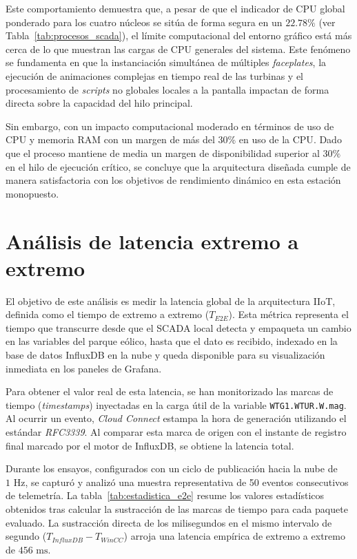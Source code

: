 Este comportamiento demuestra que, a pesar de que el indicador de \ac{CPU} global ponderado para los cuatro núcleos se sitúa de forma segura en un $22.78\%$ (ver Tabla~\ref{tab:procesos_scada}), el límite computacional del entorno gráfico está más cerca de lo que muestran las cargas de \ac{CPU} generales del sistema. Este fenómeno se fundamenta en que la instanciación simultánea de múltiples \textit{faceplates}, la ejecución de animaciones complejas en tiempo real de las turbinas y el procesamiento de \textit{scripts} no globales locales a la pantalla impactan de forma directa sobre la capacidad del hilo principal.

Sin embargo, con un impacto computacional moderado en términos de uso de \ac{CPU} y memoria \ac{RAM} con un margen de  más del $30$\% en uso de la \ac{CPU}. Dado que el proceso mantiene de media un margen de disponibilidad superior al $30\%$ en el hilo de ejecución crítico, se concluye que la arquitectura diseñada cumple de manera satisfactoria con los objetivos de rendimiento dinámico en esta estación monopuesto.
\FloatBarrier
\section{Análisis de latencia extremo a extremo}
El objetivo de este análisis es medir la latencia global de la arquitectura IIoT, definida como el tiempo de extremo a extremo ($T_{E2E}$). Esta métrica representa el tiempo que transcurre desde que el SCADA local detecta y empaqueta un cambio en las variables del parque eólico, hasta que el dato es recibido, indexado en la base de datos InfluxDB en la nube y queda disponible para su visualización inmediata en los paneles de Grafana.

Para obtener el valor real de esta latencia, se han monitorizado las marcas de tiempo (\textit{timestamps}) inyectadas en la carga útil de la variable \texttt{WTG1.WTUR.W.mag}. Al ocurrir un evento, \textit{Cloud Connect} estampa la hora de generación utilizando el estándar \textit{RFC3339}. Al comparar esta marca de origen con el instante de registro final marcado por el motor de InfluxDB, se obtiene la latencia total.

Durante los ensayos, configurados con un ciclo de publicación hacia la nube de $1\text{ Hz}$, se capturó y analizó una muestra representativa de 50 eventos consecutivos de telemetría. La tabla~\ref{tab:estadistica_e2e} resume los valores estadísticos obtenidos tras calcular la sustracción de las marcas de tiempo para cada paquete evaluado. La sustracción directa de los milisegundos en el mismo intervalo de segundo ($T_{InfluxDB}- T_{WinCC}$) arroja una latencia empírica de extremo a extremo de $456\text{ ms}$.

